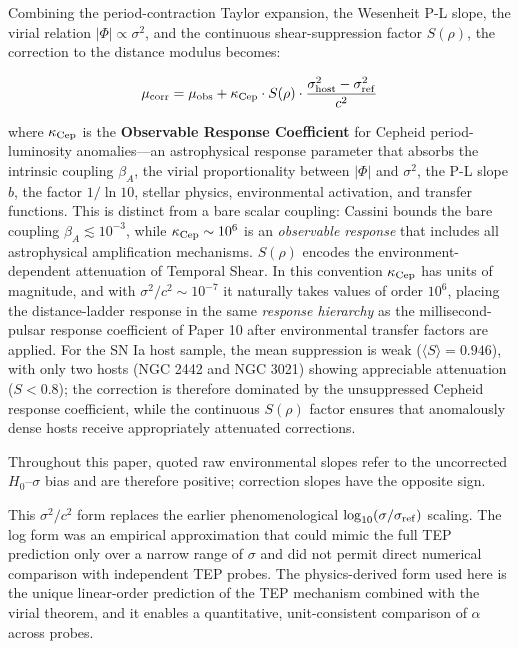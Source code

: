 \documentclass[
]{article}
\begin{document}
Combining the period-contraction Taylor expansion, the Wesenheit P-L
slope, the virial relation \(|\Phi|\propto\sigma^2\), and the continuous
shear-suppression factor \(S(\rho)\), the correction to the distance
modulus becomes:

\begin{equation}
\mu_{\rm corr} = \mu_{\rm obs} + \kappa_{\rm Cep} \cdot S(\rho) \cdot \frac{\sigma_{\rm host}^2 - \sigma_{\rm ref}^2}{c^2}
\label{eq:tep_correction}
\end{equation}

where \(\kappa_{\rm Cep}\) is the \textbf{Observable Response
Coefficient} for Cepheid period-luminosity anomalies---an astrophysical
response parameter that absorbs the intrinsic coupling \(\beta_A\), the
virial proportionality between \(|\Phi|\) and \(\sigma^2\), the P-L
slope \(b\), the factor \(1/\ln 10\), stellar physics, environmental
activation, and transfer functions. This is distinct from a bare scalar
coupling: Cassini bounds the bare coupling \(\beta_A \lesssim 10^{-3}\),
while \(\kappa_{\rm Cep} \sim 10^6\) is an \emph{observable response}
that includes all astrophysical amplification mechanisms. \(S(\rho)\)
encodes the environment-dependent attenuation of Temporal Shear. In this
convention \(\kappa_{\rm Cep}\) has units of magnitude, and with
\(\sigma^2/c^2 \sim 10^{-7}\) it naturally takes values of order
\(10^6\), placing the distance-ladder response in the same
\emph{response hierarchy} as the millisecond-pulsar response coefficient
of Paper 10 after environmental transfer factors are applied. For the SN
Ia host sample, the mean suppression is weak
(\(\langle S \rangle = 0.946\)), with only two hosts (NGC 2442 and NGC
3021) showing appreciable attenuation (\(S <
0.8\)); the correction is therefore dominated by the unsuppressed
Cepheid response coefficient, while the continuous \(S(\rho)\) factor
ensures that anomalously dense hosts receive appropriately attenuated
corrections.

Throughout this paper, quoted raw environmental slopes refer to the
uncorrected \(H_0\)--\(\sigma\) bias and are therefore positive;
correction slopes have the opposite sign.

This \(\sigma^2/c^2\) form replaces the earlier phenomenological
\(\log_{10}(\sigma/\sigma_{\rm ref})\) scaling. The log form was an
empirical approximation that could mimic the full TEP prediction only
over a narrow range of \(\sigma\) and did not permit direct numerical
comparison with independent TEP probes. The physics-derived form used
here is the unique linear-order prediction of the TEP mechanism combined
with the virial theorem, and it enables a quantitative, unit-consistent
comparison of \(\alpha\) across probes.
\end{document}
